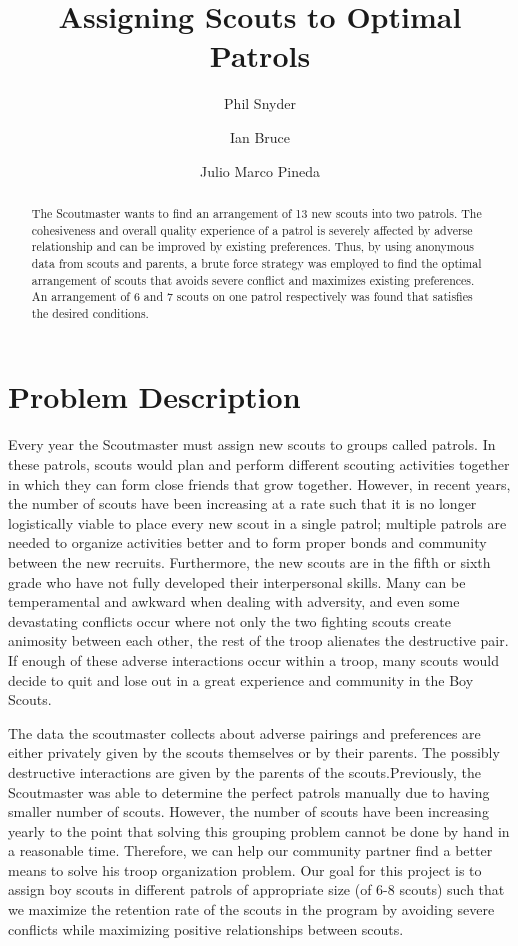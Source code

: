 \documentclass{amsart}
\theoremstyle{definition}
\theoremstyle{remark}
\numberwithin{equation}{section}
\begin{document}
\title{Assigning Scouts to Optimal Patrols}
\author{Phil Snyder}
\author{Ian Bruce}
\author{Julio Marco Pineda}

\begin{abstract}
The Scoutmaster wants to find an arrangement of 13 new scouts into two patrols. The cohesiveness and overall quality experience of a patrol is severely affected by adverse relationship and can be improved by existing preferences. Thus, by using anonymous data from scouts and parents, a brute force strategy was employed to find the optimal arrangement of scouts that avoids severe conflict and maximizes existing preferences. An arrangement of 6 and 7 scouts on one patrol respectively was found that satisfies the desired conditions. 
\end{abstract}
\maketitle
\section*{Problem Description}
Every year the Scoutmaster must assign new scouts to groups called patrols. In these patrols, scouts would plan and perform different scouting activities together in which they can form close friends that grow together. However, in recent years, the number of scouts have been increasing at a rate such that it is no longer logistically viable to place every new scout in a single patrol; multiple patrols are needed to organize activities better and to form proper bonds and community between the new recruits. Furthermore, the new scouts are in the fifth or sixth grade who have not fully developed their interpersonal skills. Many can be temperamental and awkward when dealing with adversity, and even some devastating conflicts occur where not only the two fighting scouts create animosity between each other, the rest of the troop alienates the destructive pair. If enough of these adverse interactions occur within a troop, many scouts would decide to quit and lose out in a great experience and community in the Boy Scouts.

The data the scoutmaster collects about adverse pairings and preferences are either privately given by the scouts themselves or by their parents. The possibly destructive interactions are given by the parents of the scouts.Previously, the Scoutmaster was able to determine the perfect patrols manually due to having smaller number of scouts. However, the number of scouts have been increasing yearly to the point that solving this grouping problem cannot be done by hand in a reasonable time. Therefore, we can help our community partner find a better means to solve his troop organization problem. Our goal for this project is to assign boy scouts in different patrols of appropriate size (of 6-8 scouts) such that we maximize the retention rate of the scouts in the program by avoiding severe conflicts while maximizing positive relationships between scouts.
\end{document}

